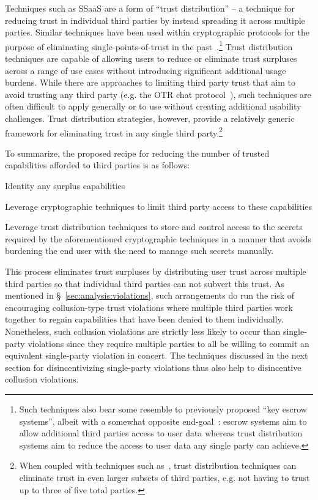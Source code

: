 Techniques such as SSaaS are a form of ``trust distribution'' -- a
technique for reducing trust in individual third parties by instead
spreading it across multiple parties. Similar techniques have been
used within cryptographic protocols for the purpose of eliminating
single-points-of-trust in the past~\cite{shamir1979}.\footnote{Such
  techniques also bear some resemble to previously proposed ``key
  escrow systems'', albeit with a somewhat opposite
  end-goal~\cite{denning1996}: escrow systems aim to allow additional
  third parties access to user data whereas trust distribution systems
  aim to reduce the access to user data any single party can achieve.}
Trust distribution techniques are capable of allowing users to reduce
or eliminate trust surpluses across a range of use cases without
introducing significant additional usage burdens. While there are
approaches to limiting third party trust that aim to avoid trusting
any third party (e.g. the OTR chat protocol~\cite{otr-v3}), such
techniques are often difficult to apply generally or to use without
creating additional usability challenges. Trust distribution
strategies, however, provide a relatively generic framework for
eliminating trust in any single third party.\footnote{When coupled
  with techniques such as~\cite{shamir1979}, trust distribution
  techniques can eliminate trust in even larger subsets of third
  parties, e.g. not having to trust up to three of five total
  parties.}

To summarize, the proposed recipe for reducing the number of trusted
capabilities afforded to third parties is as follows:

\begin{packed_enum}
\item Identity any surplus capabilities
\item Leverage cryptographic techniques to limit third party access to
  these capabilities
\item Leverage trust distribution techniques to store and control
  access to the secrets required by the aforementioned cryptographic
  techniques in a manner that avoids burdening the end user with the
  need to manage such secrets manually.
\end{packed_enum}

This process eliminates trust surpluses by distributing user trust
across multiple third parties so that individual third parties can not
subvert this trust. As mentioned in \S~\ref{sec:analysis:violations},
such arrangements do run the risk of encouraging collusion-type trust
violations where multiple third parties work together to regain
capabilities that have been denied to them individually. Nonetheless,
such collusion violations are strictly less likely to occur than
single-party violations since they require multiple parties to all be
willing to commit an equivalent single-party violation in concert. The
techniques discussed in the next section for disincentivizing
single-party violations thus also help to disincentive collusion
violations.

